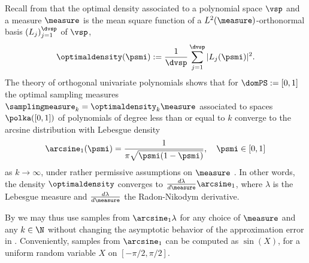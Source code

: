 Recall from  that the optimal density associated to a polynomial space $\vsp$ and a measure $\measure$ is the mean square function of a $L^2(\measure)$-orthonormal basis $(L_j)_{j=1}^{\dvsp}$ of $\vsp$,
\begin{equation*}
\optimaldensity(\psmi):=\frac{1}{\dvsp}\sum_{j=1}^{\dvsp}|L_j(\psmi)|^2.
\end{equation*}
 The theory of orthogonal univariate polynomials shows that for $\domPS:=[0,1]$ the optimal sampling measures $\samplingmeasure_{k}=\optimaldensity_{k}\measure$ associated to spaces $\polka([0,1])$ of polynomials of degree less than or equal to $k$ converge to the arcsine distribution with Lebesgue density
\begin{equation}
\label{eq:arcsine}
\arcsine_{1}(\psmi)=\frac{1}{\pi \sqrt{\psmi(1-\psmi)}}, \quad\psmi\in[0,1]
\end{equation}
as $k\to\infty$, under rather permissive assumptions on $\measure$ \cite{}.
In other words, the density $\optimaldensity$ converges to $\frac{d\lambda}{d\measure}\arcsine_{1}$, where $\lambda$ is the Lebesgue measure and $\frac{d\lambda}{d\measure}$ the Radon-Nikodym derivative. 

By  we may thus use samples from $\arcsine_{1}\lambda$ for any choice of $\measure$ and any $k\in\N$ without changing the asymptotic behavior of the approximation error in . Conveniently, samples from $\arcsine_{1}$ can be computed as $\sin(X)$, for a uniform random variable $X$ on $[-\pi/2,\pi/2]$.


